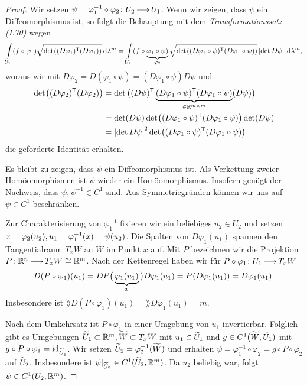 \documentclass[skript.tex]{subfiles}
\begin{document}
\begin{proof}
	Wir setzen $\psi = \varphi_1^{-1} \circ \varphi_2 \colon U_2 \kern -1pt \longrightarrow \kern -1pt U_1$. Wenn wir zeigen, dass $\psi$ ein Diffeomorphismus ist, so folgt die Behauptung mit dem \textit{Transformationssatz (I.70)} wegen
	\[
		\lint_{U_1} (f\circ \varphi_1) \sqrt{\det \pr{(D\varphi_1)^\tp (D\varphi_1)}} \md \lambda^m = \lint_{U_2} (f\circ \underbrace{\varphi_1 \circ \psi)}_{\varphi_2} \sqrt{\det \pr{(D\varphi_1 \circ \psi)^\tp (D\varphi_1 \circ \psi)}} \abs{\det D\psi} \md \lambda^m,
	\]
	woraus wir mit $D\varphi_2 = D(\varphi_1 \circ \psi) = (D\varphi_1 \circ \psi) D\psi$ und
	\begin{align*}
		\det \pr{(D\varphi_2)^\tp (D\varphi_2)} &= \det \big( (D\psi)^\tp \underbrace{(D\varphi_1 \circ \psi)^\tp (D\varphi_1 \circ \psi)}_{\in \R^{m\times m}} (D\psi) \big)\\
		&= \det (D\psi) \det \pr{(D\varphi_1 \circ \psi)^\tp (D\varphi_1 \circ \psi)} \det (D\psi)\\
		&= \abs{\det D\psi}^2 \det \pr{(D\varphi_1 \circ \psi)^\tp (D\varphi_1 \circ \psi)}
	\end{align*}
	die geforderte Identität erhalten.
	
	Es bleibt zu zeigen, dass $\psi$ ein Diffeomorphismus ist. Als Verkettung zweier Homöomorphismen ist $\psi$ wieder ein Homöomorphismus. Insofern genügt der Nachweis, dass $\psi, \psi^{-1} \in C^1$ sind. Aus Symmetriegründen können wir uns auf $\psi \in C^1$ beschränken. 
	
	Zur Charakterisierung von $\varphi_1^{-1}$ fixieren wir ein beliebiges $u_2 \in U_2$ und setzen $x=\varphi_2(u_2),\\u_1=\varphi_1^{-1}(x) = \psi(u_2)$. Die Spalten von $D\varphi_1(u_1)$ spannen den Tangentialraum $T_x W$ an $W$ im Punkt $x$ auf. Mit $P$ bezeichnen wir die Projektion $P\colon {\mathbb{R}^n} \kern -1pt \longrightarrow \kern -1pt T_x W \cong \mathbb{R}^m$. Nach der Kettenregel haben wir für $P \circ \varphi_1 \colon U_1 \kern -1pt \longrightarrow \kern -1pt T_x W$
	\[
		D(P\circ \varphi_1)(u_1) = DP\big( \underbrace{\varphi_1(u_1)}_{x} \big) D\varphi_1(u_1) = P\pr{D\varphi_1(u_1)} = D\varphi_1(u_1).
	\]
	Insbesondere ist $\rang D(P\circ\varphi_1)(u_1) = \rang D\varphi_1(u_1) = m$.
	
	Nach dem Umkehrsatz ist $P\circ \varphi_1$ in einer Umgebung von $u_1$ invertierbar. Folglich gibt es Umgebungen $\widetilde{U}_1 \subset \mathbb{R}^m, \widetilde{W} \subset T_x W$ mit $u_1 \in \widetilde{U}_1$ und $g \in C^1(\widetilde{W}, \widetilde{U}_1)$ mit $g \circ P \circ \varphi_1 = \mathrm{id}_{\widetilde{U}_1}$. Wir setzen $\widetilde{U}_2 = \varphi_2^{-1}(\widetilde{W})$ und erhalten $\psi = \varphi_1^{-1} \circ \varphi_2 = g \circ P \circ \varphi_2$ auf $\widetilde{U}_2$. Insbesondere ist $\psi|_{\widetilde{U}_2} \in C^1(\widetilde{U}_2, \mathbb{R}^m)$. Da $u_2$ beliebig war, folgt $\psi \in C^1(U_2, \mathbb{R}^m)$.
	

\end{proof}
\end{document}
